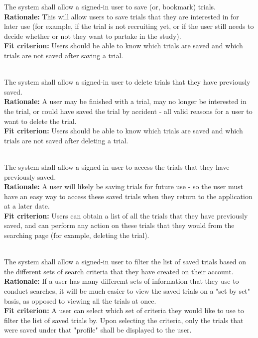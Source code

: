 \documentclass[12pt, titlepage]{article}
\newcounter{FR_Counter}
\begin{document}
The system shall allow a signed-in user to save (or, bookmark) trials. \\
\textbf{Rationale:}
This will allow users to save trials that they are interested in for later use (for example, if the trial is not recruiting yet, or 
if the user still needs to decide whether or not they want to partake in the study).\\
\textbf{Fit criterion:}
Users should be able to know which trials are saved and which trials are not saved after saving a trial.\\~\\
\addtocounter{FR_Counter}{1}

The system shall allow a signed-in user to delete trials that they have previously saved. \\
\textbf{Rationale:}
A user may be finished with a trial, may no longer be interested in the trial, or could have saved the trial by accident - all valid reasons 
for a user to want to delete the trial.\\
\textbf{Fit criterion:}
Users should be able to know which trials are saved and which trials are not saved after deleting a trial.\\~\\
\addtocounter{FR_Counter}{1}

The system shall allow a signed-in user to access the trials that they have previously saved. \\
\textbf{Rationale:}
A user will likely be saving trials for future use - so the user must have an easy way to access these saved trials when they return 
to the application at a later date.\\
\textbf{Fit criterion:}
Users can obtain a list of all the trials that they have previously saved, and can perform any action on these trials that they 
would from the searching page (for example, deleting the trial).\\~\\
\addtocounter{FR_Counter}{1}

The system shall allow a signed-in user to filter the list of saved trials based on the different sets of search criteria that they have created on their account. \\
\textbf{Rationale:}
If a user has many differemt sets of information that they use to conduct searches, it will be much easier to view the saved trials on a 
"set by set" basis, as opposed to viewing all the trials at once.\\
\textbf{Fit criterion:}
A user can select which set of criteria they would like to use to filter the list of saved trials by. Upon selecting the criteria, only 
the trials that were saved under that "profile" shall be displayed to the user.\\~\\
\addtocounter{FR_Counter}{1}
\end{document}
